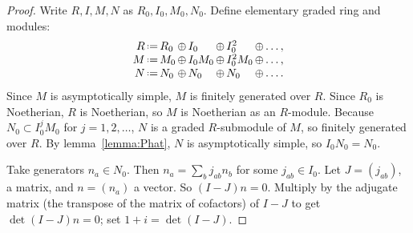\begin{proof}
Write \(R,I,M,N\) as \(R_0,I_0,M_0,N_0\).
Define elementary graded ring and modules:
\[
\begin{array}{r@{\,}c@{\,}l@{\,}c@{\,}l@{\,}c@{\,}l@{\,}c@{\,}c}
R&\defeq&R_0&\oplus&I_0&\oplus&I_0^2&\oplus&\dots,\\
M&\defeq&M_0&\oplus&I_0M_0&\oplus&I_0^2M_0&\oplus&\dots,\\
N&\defeq&N_0&\oplus&N_0&\oplus&N_0&\oplus&\dots.
\end{array}
\]
Since \(M\) is asymptotically simple, \(M\)  is  finitely  generated  over \(R\).
Since \(R_0\) is Noetherian, \(R\) is Noetherian, so \(M\) is Noetherian as an \(R\)-module.
Because \(N_0\subset I_0^jM_0\)  for  \(j=1,2,\dots\), \(N\) is a graded  \(R\)-submodule  of \(M\),  so finitely generated over \(R\).  By lemma~\vref{lemma:Phat}, \(N\) is asymptotically simple, so \(I_0N_0 = N_0\).

Take generators \(n_a\in N_0\).
Then \(n_a=\sum_b j_{ab}n_b\) for some \(j_{ab} \in I_0\).
Let \(J=(j_{ab})\), a matrix, and \(n=(n_a)\) a vector.
So \((I-J)n=0\).
Multiply by the adjugate matrix (the transpose of the matrix of cofactors) of \(I-J\) to get \(\det(I-J)n=0\); set \(1+i=\det(I-J)\).
\end{proof}


